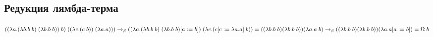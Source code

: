\documentclass{article}
\begin{document}
\begin{center}
\section*{Редукция лямбда-терма}
$((\lambda a.(\lambda b.b\; b)\; (\lambda b.b\; b))\; b)\; ((\lambda c.(c\; b))\; (\lambda a.a))) \to_\beta \\
((\lambda a.(\lambda b.b\; b)\; (\lambda b.b\; b)[a := b])\; (\lambda c.(c[c := \lambda a.a]\; b)) = ((\lambda b.b\; b)(\lambda b.b\; b))(\lambda a.a\; b) \to_\beta \\
((\lambda b.b\; b)(\lambda b.b\; b))(\lambda a.a [a := b]) = \Omega\; b$
\end{center}
\end{document}
